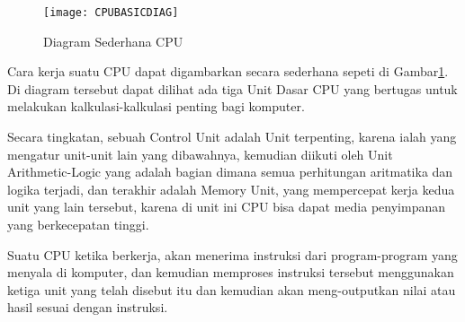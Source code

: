 \begin{figure}[h]
    \centering
    \texttt{[image: CPUBASICDIAG]}
    \caption{Diagram Sederhana CPU}
    \label{fig:CPUBASICDIAG}
\end{figure}

Cara kerja suatu CPU dapat digambarkan secara sederhana sepeti di Gambar\ref{fig:CPUBASICDIAG}.
Di diagram tersebut dapat dilihat ada tiga Unit Dasar CPU yang bertugas untuk melakukan
kalkulasi-kalkulasi penting bagi komputer.

Secara tingkatan, sebuah Control Unit adalah Unit terpenting, karena ialah yang mengatur
unit-unit lain yang dibawahnya, kemudian diikuti oleh Unit Arithmetic-Logic yang
adalah bagian dimana semua perhitungan aritmatika dan logika terjadi, dan terakhir
adalah Memory Unit, yang mempercepat kerja kedua unit yang lain tersebut, karena
di unit ini CPU bisa dapat media penyimpanan yang berkecepatan tinggi.

Suatu CPU ketika berkerja, akan menerima instruksi dari program-program yang menyala
di komputer, dan kemudian memproses instruksi tersebut menggunakan ketiga unit yang
telah disebut itu dan kemudian akan meng-outputkan nilai atau hasil sesuai dengan
instruksi.
